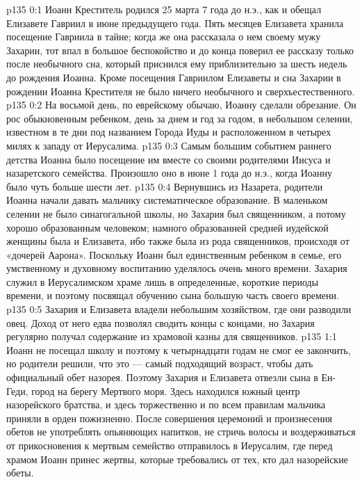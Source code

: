 \author{Комиссия срединников}
\vs p135 0:1 Иоанн Креститель родился 25 марта 7 года до н.э., как и обещал Елизавете Гавриил в июне предыдущего года. Пять месяцев Елизавета хранила посещение Гавриила в тайне; когда же она рассказала о нем своему мужу Захарии, тот впал в большое беспокойство и до конца поверил ее рассказу только после необычного сна, который приснился ему приблизительно за шесть недель до рождения Иоанна. Кроме посещения Гавриилом Елизаветы и сна Захарии в рождении Иоанна Крестителя не было ничего необычного и сверхъестественного.
\vs p135 0:2 На восьмой день, по еврейскому обычаю, Иоанну сделали обрезание. Он рос обыкновенным ребенком, день за днем и год за годом, в небольшом селении, известном в те дни под названием Города Иуды и расположенном в четырех милях к западу от Иерусалима.
\vs p135 0:3 Самым большим событием раннего детства Иоанна было посещение им вместе со своими родителями Иисуса и назаретского семейства. Произошло оно в июне 1 года до н.э., когда Иоанну было чуть больше шести лет.
\vs p135 0:4 Вернувшись из Назарета, родители Иоанна начали давать мальчику систематическое образование. В маленьком селении не было синагогальной школы, но Захария был священником, а потому хорошо образованным человеком; намного образованней средней иудейской женщины была и Елизавета, ибо также была из рода священников, происходя от «дочерей Аарона». Поскольку Иоанн был единственным ребенком в семье, его умственному и духовному воспитанию уделялось очень много времени. Захария служил в Иерусалимском храме лишь в определенные, короткие периоды времени, и поэтому посвящал обучению сына большую часть своего времени.
\vs p135 0:5 Захария и Елизавета владели небольшим хозяйством, где они разводили овец. Доход от него едва позволял сводить концы с концами, но Захария регулярно получал содержание из храмовой казны для священников.
\vs p135 1:1 Иоанн не посещал школу и поэтому к четырнадцати годам не смог ее закончить, но родители решили, что это --- самый подходящий возраст, чтобы дать официальный обет назорея. Поэтому Захария и Елизавета отвезли сына в Ен\hyp{}Геди, город на берегу Мертвого моря. Здесь находился южный центр назорейского братства, и здесь торжественно и по всем правилам мальчика приняли в орден пожизненно. После совершения церемоний и произнесения обетов не употреблять опьяняющих напитков, не стричь волосы и воздерживаться от прикосновения к мертвым семейство отправилось в Иерусалим, где перед храмом Иоанн принес жертвы, которые требовались от тех, кто дал назорейские обеты.

